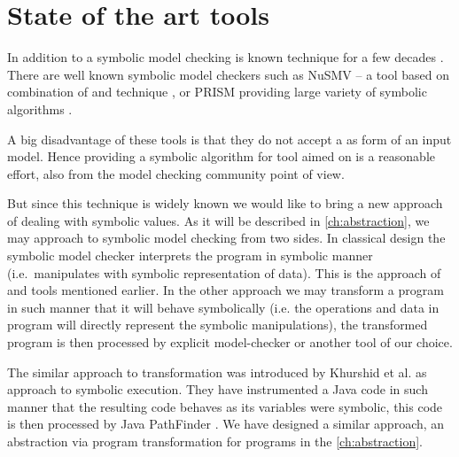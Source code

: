 \section{State of the art tools}

In addition to \SymDIVINE a symbolic model checking is known technique for a few
decades \cite{McMillan93}. There are well known symbolic model checkers such as
NuSMV -- a tool based on combination of \SMT and \BDD technique
\cite{Cimatti20}, or PRISM providing large variety of symbolic algorithms
\cite{Kwiatkowska20}.

A big disadvantage of these tools is that they do not accept a \Cpp{} as form of
an input model. Hence providing a symbolic algorithm for tool aimed on \Cpp{} is a
reasonable effort, also from the model checking community point of view.

But since this technique is widely known we would like to bring a new approach
of dealing with symbolic values. As it will be described in
\autoref{ch:abstraction}, we may approach to symbolic model checking from two
sides. In classical design the symbolic model checker interprets the program
in symbolic manner (i.e.~manipulates with symbolic representation of data). This
is the approach of \SymDIVINE and tools mentioned earlier. In the other approach
we may transform a program in such manner that it will behave symbolically (i.e.
the operations and data in program will directly represent the symbolic
manipulations), the transformed program is then processed by explicit
model-checker or another tool of our choice.

The similar approach to transformation was introduced by Khurshid et al.
\cite{Khurshid03} as approach to symbolic execution. They have instrumented a
Java code in such manner that the resulting code behaves as its variables were
symbolic, this code is then processed by Java PathFinder \cite{Havelund20}. We
have designed a similar approach, an abstraction via program transformation for
\LLVM programs in the \autoref{ch:abstraction}.
